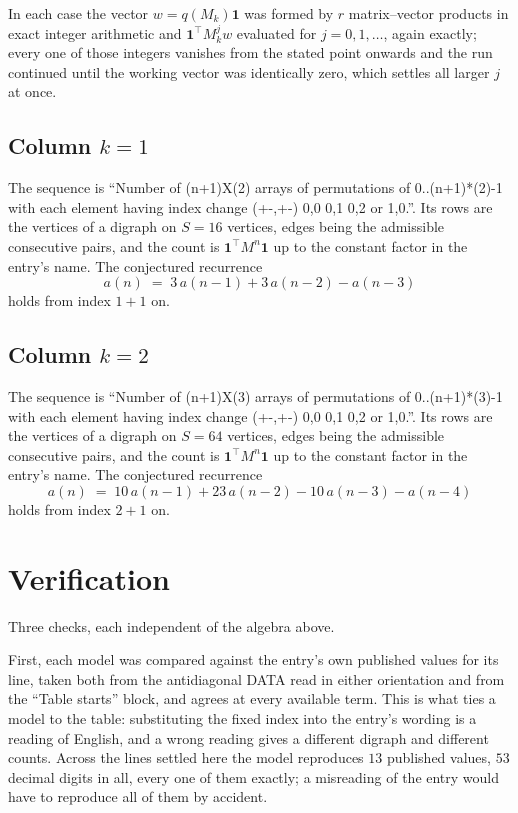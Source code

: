 \documentclass[11pt,a4paper]{article}
\theoremstyle{plain}
\theoremstyle{definition}
\begin{document}
In each case the vector $w=q(M_k)\mathbf{1}$ was formed by $r$ matrix--vector products in
exact integer arithmetic and $\mathbf{1}^{\!\top}M_k^{j}w$ evaluated for $j=0,1,\dots$,
again exactly; every one of those integers vanishes from the stated point onwards and the run
continued until the working vector was identically zero, which settles all larger $j$ at once.

\subsection*{Column $k$$=1$}
The sequence is ``Number of (n+1)X(2) arrays of permutations of 0..(n+1)*(2)-1 with each element having index change (+-,+-) 0,0 0,1 0,2 or 1,0.''. Its rows are the vertices of a digraph on
$S=16$ vertices, edges being the admissible consecutive pairs, and the count is
$\mathbf{1}^{\!\top}M^{n}\mathbf{1}$ up to the constant factor in the entry's name.
The conjectured recurrence
\[
a(n)\;=\;3\,a(n-1) + 3\,a(n-2) - a(n-3)
\]
holds from index $1+1$ on.

\subsection*{Column $k$$=2$}
The sequence is ``Number of (n+1)X(3) arrays of permutations of 0..(n+1)*(3)-1 with each element having index change (+-,+-) 0,0 0,1 0,2 or 1,0.''. Its rows are the vertices of a digraph on
$S=64$ vertices, edges being the admissible consecutive pairs, and the count is
$\mathbf{1}^{\!\top}M^{n}\mathbf{1}$ up to the constant factor in the entry's name.
The conjectured recurrence
\[
a(n)\;=\;10\,a(n-1) + 23\,a(n-2) - 10\,a(n-3) - a(n-4)
\]
holds from index $2+1$ on.

\section{Verification}

Three checks, each independent of the algebra above.

First, each model was compared against the entry's own published values for its line, taken
both from the antidiagonal DATA read in either orientation and from the ``Table starts''
block, and agrees at every available term. This is what ties a model to the table:
substituting the fixed index into the entry's wording is a reading of English, and a wrong
reading gives a different digraph and different counts. Across the lines settled here the
model reproduces $13$ published values, $53$ decimal digits in all, every one of
them exactly; a misreading of the entry would have to reproduce all of them by accident.
\end{document}
